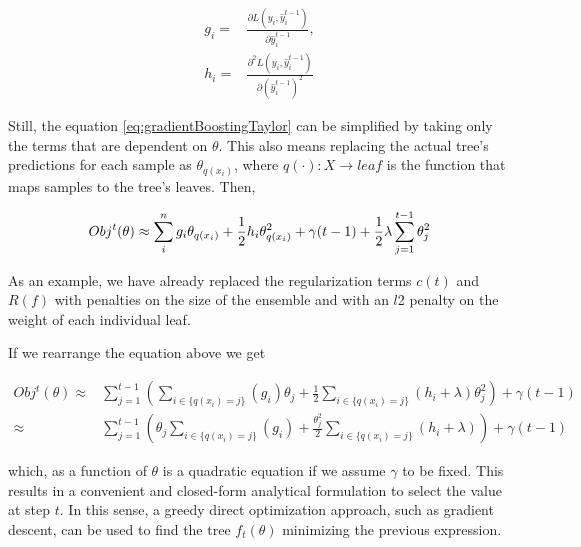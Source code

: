 \begin{equation}
\begin{split}
g_i = & \frac{\partial L(y_i, \hat{y}^{t-1}_i)}{\partial \hat{y}^{t-1}_i},  \\
h_i = & \frac{\partial^2 L(y_i, \hat{y}^{t-1}_i)}{\partial {(\hat{y}^{t-1}_i)}^2 }
\end{split}
\end{equation}

Still, the equation \cref{eq:gradientBoostingTaylor} can be simplified by taking only the terms that are dependent on $\theta$. 
This also means replacing the actual tree's predictions for each sample as $\theta_{q(x_i)}$, where $q(\cdot): X \rightarrow leaf$ is the function that maps samples to the tree's leaves. Then,


\begin{equation}\label{eq:gb-objSteps1}
Obj^t(\theta) \approx \sum_i^n {g_i \theta_{q(x_i)} + \frac{1}{2} h_i \theta_{q(x_i)}^2 } + \gamma ({t-1}) + \frac{1}{2}\lambda \sum_{j=1}^{t-1} \theta_j^2 \\
\end{equation}

As an example, we have already replaced the regularization terms $c(t)$ and $R(f)$ with penalties on the size of the ensemble and with an $l$2 penalty on the weight of each individual leaf.

If we rearrange the equation above we get

\begin{equation}\label{eq:gb-objSteps2}
\begin{split}
Obj^t(\theta) \approx & \sum_{j=1}^{t-1} \left( \sum_{i \in \{q(x_i)=j\}} (g_i )\theta_{j} + \frac{1}{2} \sum_{i \in \{q(x_i)=j\}} (h_i + \lambda ) \theta_{j}^2 \right) + \gamma ({t-1}) \\
\approx & \sum_{j=1}^{t-1} \left( \theta_{j}\sum_{i \in \{q(x_i)=j\}} (g_i ) + \frac{\theta_{j}^2}{2} \sum_{i \in \{q(x_i)=j\}} (h_i + \lambda ) \right) + \gamma ({t-1})
\end{split}
\end{equation}

which, as a function of $\theta$ is a quadratic equation if we assume $\gamma$ to be fixed. 
This results in a convenient and closed-form analytical formulation to select the value at step $t$. 
In this sense, a greedy direct optimization approach, such as gradient descent, can be used to find the tree $f_t(\theta)$ minimizing the previous expression.

